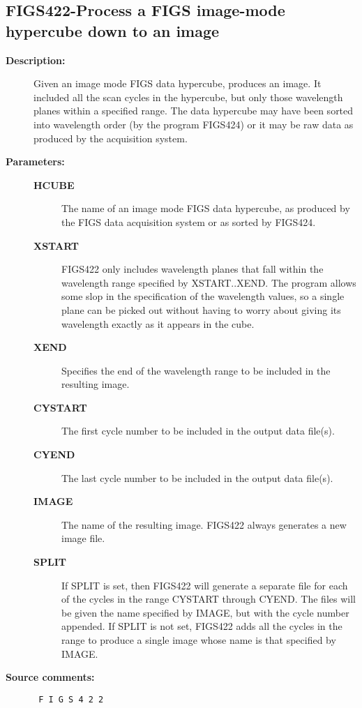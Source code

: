 \subsection{FIGS422-\label{FIGS422}Process a FIGS image-mode hypercube down to an image}
\begin{description}

\item [{\bf Description:}]
 Given an image mode FIGS data hypercube, produces an image.
 It included all the scan cycles in the hypercube, but only
 those wavelength planes within a specified range.  The data
 hypercube may have been sorted into wavelength order (by the
 program FIGS424) or it may be raw data as produced by the
 acquisition system.

\item [{\bf Parameters:}]
\begin{description}
\item [{\bf HCUBE}]
 The name of an image mode FIGS data hypercube,
 as produced by the FIGS data acquisition system
 or as sorted by FIGS424.
\item [{\bf XSTART}]
 FIGS422 only includes wavelength planes that fall
 within the wavelength range specified by XSTART..XEND.
 The program allows some slop in the specification of
 the wavelength values, so a single plane can be picked
 out without having to worry about giving its wavelength
 exactly as it appears in the cube.
\item [{\bf XEND}]
 Specifies the end of the wavelength range to be
 included in the resulting image.
\item [{\bf CYSTART}]
 The first cycle number to be included in the
 output data file(s).
\item [{\bf CYEND}]
 The last cycle number to be included in the
 output data file(s).
\item [{\bf IMAGE}]
 The name of the resulting image.
 FIGS422 always generates a new image file.
\item [{\bf SPLIT}]
 If SPLIT is set, then FIGS422 will generate a separate
 file for each of the cycles in the range CYSTART through
 CYEND.  The files will be given the name specified by
 IMAGE, but with the cycle number appended.  If SPLIT is
 not set, FIGS422 adds all the cycles in the range to
 produce a single image whose name is that specified by
 IMAGE.
\end{description}

\item [{\bf Source comments:}]
\begin{verbatim}
 F I G S 4 2 2


\end{verbatim}
\end{description}
